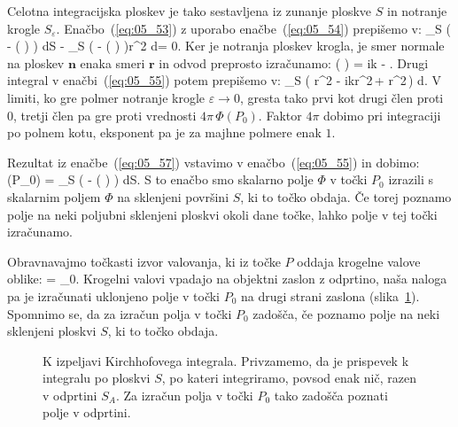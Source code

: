Celotna integracijska ploskev je tako sestavljena iz zunanje ploskve
$S$ in notranje krogle $S_\varepsilon$. Enačbo~(\ref{eq:05_53}) z uporabo
enačbe~(\ref{eq:05_54}) prepišemo v:
\beq
\oint_S \left(  -
\Phi{}\left(  \right)\!\! \right) dS -
\oint_{S\varepsilon} \left(  -
\Phi{}\left(  \right)\!\! \right)r^2 d\Omega = 0.
\label{eq:05_55}
\eeq
Ker je notranja ploskev krogla, je smer normale na ploskev $\mathbf{n}$ enaka smeri $\mathbf{r}$ in
odvod preprosto izračunamo:
\beq
{}\left( \right)  = ik  - .
\label{eq:05_56}
\eeq
Drugi integral v enačbi~(\ref{eq:05_55}) potem prepišemo v:
\beq
\oint_{S\varepsilon} \left( r^2 -
ikr^2\,\Phi + r^2\,\Phi\right) d\Omega.
\label{eq:05_57}
\eeq
V limiti, ko gre polmer notranje krogle $\varepsilon \to 0$, gresta tako prvi kot 
drugi člen proti 0, tretji člen pa gre proti vrednosti $4\pi\, \Phi(P_0)$. Faktor $4\pi$ 
dobimo pri integraciji po polnem kotu, eksponent pa je za majhne polmere enak $1$.

Rezultat iz enačbe~(\ref{eq:05_57}) vstavimo v enačbo~(\ref{eq:05_55}) in dobimo:
\beq
\Phi(P_0) =  \oint_S \left(  -
\Phi{}\left(  \right)\!\! \right) dS.
\label{eq:05_58}
\eeq
S to enačbo smo skalarno polje $\Phi$ v točki $P_0$ 
izrazili s skalarnim poljem $\Phi$ na sklenjeni površini $S$, ki to točko obdaja. Če torej 
poznamo polje na neki poljubni sklenjeni ploskvi okoli dane točke, lahko polje v tej 
točki izračunamo.

Obravnavajmo točkasti izvor valovanja, ki iz točke $P$ oddaja krogelne valove 
oblike:
\beq
\Phi = _0.
\label{eq:05_58a}
\eeq
Krogelni valovi vpadajo na objektni zaslon z odprtino, 
naša naloga pa je izračunati uklonjeno polje v točki $P_0$ na drugi strani zaslona 
(slika~\ref{fig:05_Kirchhoff}). 
Spomnimo se, da za izračun polja v točki $P_0$ zadošča, če poznamo polje na neki
sklenjeni ploskvi $S$, ki to točko obdaja.

\begin{figure}[ht]
\centering
\def\svgwidth{80truemm} 

\caption{K izpeljavi Kirchhofovega integrala. Privzamemo, da je prispevek k integralu po 
ploskvi $S$, po kateri integriramo, povsod enak nič, razen v odprtini $S_A$. Za izračun
polja v točki $P_0$ tako zadošča poznati polje v odprtini.}
\label{fig:05_Kirchhoff}
\end{figure}


